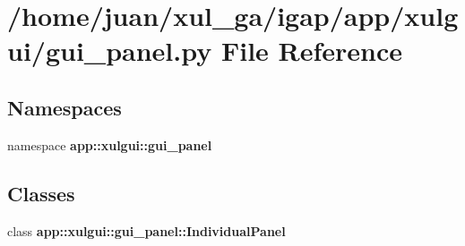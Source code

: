 \section{/home/juan/xul\_\-ga/igap/app/xulgui/gui\_\-panel.py File Reference}
\label{gui__panel_8py}
\subsection*{Namespaces}
\begin{CompactItemize}
\item 
namespace {\bf app::xulgui::gui\_\-panel}
\end{CompactItemize}
\subsection*{Classes}
\begin{CompactItemize}
\item 
class {\bf app::xulgui::gui\_\-panel::IndividualPanel}
\end{CompactItemize}
